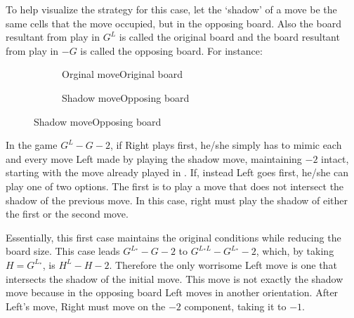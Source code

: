 To help visualize the strategy for this case, let the `shadow' of a move be the same cells that the move occupied, but in the opposing board. Also the board resultant from play in $G^L$ is called the original board and the board resultant from play in $-G$ is called the opposing board. For instance:

\begin{figure}[h]
	\centering
	\begin{subfigure}{0.17\linewidth} \centering
		\caption*{\hspace{0.1cm}Orginal move\newline Original board}
	\end{subfigure}
	\hspace{1cm}
	\begin{subfigure}{0.17\linewidth} \centering
		\caption*{\hspace{0.15cm}Shadow move\newline Opposing board}
	\end{subfigure}
\end{figure}

In the game $G^L -G -2$, if Right plays first, he/she simply has to mimic each and every move Left made by playing the shadow move, maintaining $-2$ intact, starting with the move already played in . If, instead Left goes first, he/she can play one of two options. The first is to play a move that does not intersect the shadow of the previous move. In this case, right must play the shadow of either the first or the second move.

Essentially, this first case maintains the original conditions while reducing the board size. This case leads $G^{L_*} -G -2$ to $G^{L_*L} -G^{L_*} -2$, which, by taking $H = G^{L_*}$, is $H^{L} -H -2$. Therefore the only worrisome Left move is one that intersects the shadow of the initial move. This move is not exactly the shadow move because in the opposing board Left moves in another orientation. After Left's move, Right must move on the $-2$ component, taking it to $-1$.


